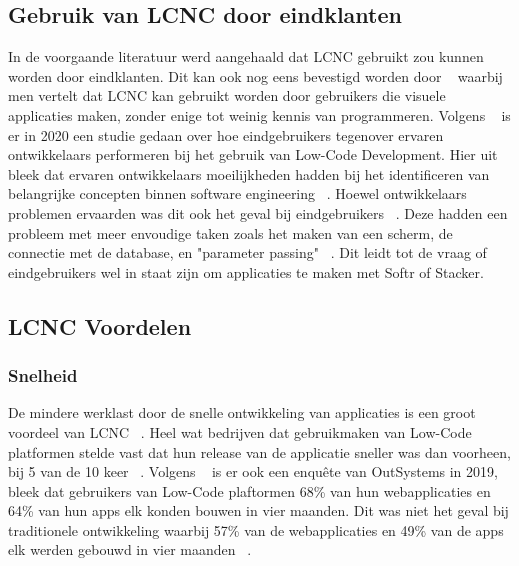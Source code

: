 \subsection*{Gebruik van LCNC door eindklanten}
\label{sub:gebruik-van-lcnc-door-eindklanten}
In de voorgaande literatuur werd aangehaald dat LCNC gebruikt zou kunnen worden door eindklanten. Dit kan ook nog eens bevestigd
worden door ~\textcite{Yan2021} waarbij men vertelt dat LCNC kan gebruikt worden door gebruikers die visuele applicaties maken, zonder enige tot weinig kennis van programmeren. 
Volgens ~\textcite{Hintsch2021} is er in 2020 een studie gedaan over hoe eindgebruikers tegenover ervaren ontwikkelaars performeren bij het gebruik van Low-Code Development.
Hier uit bleek dat ervaren ontwikkelaars moeilijkheden hadden bij het identificeren van belangrijke concepten binnen software engineering ~\autocite{Hintsch2021}. Hoewel ontwikkelaars problemen ervaarden was dit ook het geval bij eindgebruikers ~\autocite{Hintsch2021}. Deze hadden een probleem met meer envoudige taken zoals het maken van een scherm,
de connectie met de database, en "parameter passing" ~\autocite{Hintsch2021}. Dit leidt tot de vraag of eindgebruikers wel in staat zijn om applicaties te maken met Softr of Stacker.
\subsection*{LCNC Voordelen}
\label{sub:lcnc-voordelen}
\subsubsection*{Snelheid}
\label{sub:snelheid}
De mindere werklast door de snelle ontwikkeling van applicaties is een groot voordeel van LCNC ~\autocite{Adrian_2020}.
Heel wat bedrijven dat gebruikmaken van Low-Code platformen stelde vast dat hun release van de applicatie sneller was dan voorheen, bij 5 van de 10 keer ~\autocite{Yan2021}.
Volgens ~\textcite{Yan2021} is er ook een enquête van OutSystems in 2019, bleek dat gebruikers van Low-Code plaftormen 68\% van hun webapplicaties en 64\% van hun apps elk konden bouwen in vier maanden.
Dit was niet het geval bij traditionele ontwikkeling waarbij 57\% van de webapplicaties en 49\% van de apps elk werden gebouwd in vier maanden ~\autocite{Yan2021}.

